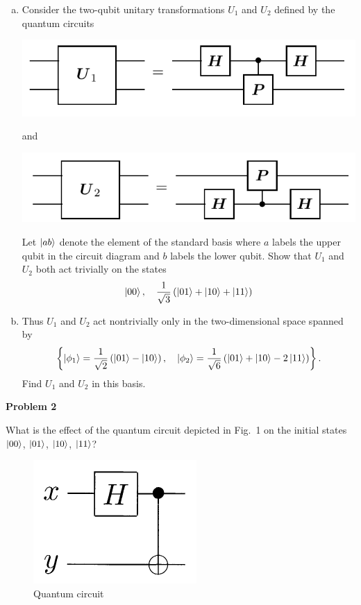 \documentclass[a4paper,11pt]{article}
\newcommand{\Problem}[1]{
  {
  \vspace*{0.5cm}
  \textsf{\textbf{Problem #1}}
  \vspace*{0.2cm}
  
  }
}
\begin{document}
\begin{enumerate}[a)]
\item Consider the two-qubit unitary transformations $U_1$ and $U_2$ defined by the quantum circuits
\begin{center}
\includegraphics[scale=0.4]{images/u1.png}
\end{center}
and
\begin{center}
\includegraphics[scale=0.4]{images/u2.png}
\end{center}
Let $\ket{ab}$ denote the element of the standard basis where $a$ labels the upper qubit in the circuit diagram
and $b$ labels the lower qubit. Show that $U_1$ and $U_2$ both act trivially on the states
\begin{equation}
\ket{00}, \quad \frac{1}{\sqrt 3}\left(\ket{01} + \ket{10} + \ket{11}\right)
\end{equation}

\item Thus $U_1$ and $U_2$ act nontrivially only in the two-dimensional space spanned by
\begin{equation}
\left\{ \ket{\phi_1} = \frac{1}{\sqrt 2}\left(\ket{01}-\ket{10}\right), \quad \ket{\phi_2} = \frac{1}{\sqrt 6}\left(\ket{01} + \ket{10} - 2\ket{11}\right) \right\}.
\end{equation}
Find $U_1$ and $U_2$ in this basis.
\end{enumerate}

\Problem 2
What is the effect of the quantum circuit depicted in Fig.\ 1
on the initial states $\ket{00}$, $\ket{01}$, $\ket{10}$, $\ket{11}$?
\begin{figure}[h!]
\centering
\includegraphics[scale=0.44]{images/epr_gate.png}
\caption{Quantum circuit}
\end{figure}
\end{document}
